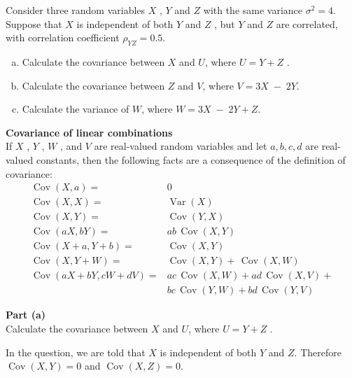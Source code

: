 \documentclass[a4paper,12pt]{article}
\begin{document}
\large \noindent Consider three random variables $X$ , $Y$ and $Z$ with the same variance $\sigma^2 = 4$. Suppose
that $X$ is independent of both $Y$ and $Z$ , but $Y$ and $Z$ are correlated, with correlation
coefficient $\rho_{YZ} = 0.5$.
\begin{enumerate}[(a)]
    \item Calculate the covariance between $X$ and $U$, where $U = Y+Z$ . 
    \item  Calculate the covariance between $Z$ and $V$, where $V = 3 X \;-\; 2 Y $. 
    \item  Calculate the variance of $W$, where $W = 3 X \;-\; 2 Y + Z .$
\end{enumerate}


\begin{framed}
\noindent \textbf{Covariance of linear combinations}\\
If 
$ {\displaystyle X} $
, 
$ {\displaystyle Y} $
, 
$ {\displaystyle W} $
, and 
${\displaystyle V}$
 are real-valued random variables and let 
${\displaystyle a,b,c,d}$ are real-valued constants, then the following facts are a consequence of the definition of covariance: 
\[
{\displaystyle {\begin{aligned}\operatorname {Cov} (X,a) =&0\\\operatorname {Cov} (X,X)=&\operatorname {Var} (X)\\\operatorname {Cov} (X,Y)=&\operatorname {Cov} (Y,X)\\\operatorname {Cov} (aX,bY)=&ab\,\operatorname {Cov} (X,Y)\\\operatorname {Cov} (X+a,Y+b)=&\operatorname {Cov} (X,Y)\\
\operatorname {Cov} (X,Y+W)=&\operatorname {Cov} (X,Y) + \,\operatorname {Cov} (X,W) \\
\operatorname {Cov} (aX+bY,cW+dV)=&ac\,\operatorname {Cov} (X,W)+ad\,\operatorname {Cov} (X,V) + \\& bc\,\operatorname {Cov} (Y,W)+bd\,\operatorname {Cov} (Y,V)\end{aligned}}} 
\]
\end{framed}
\newpage
\begin{framed}
\noindent \textbf{Part (a)} \\
\large
Calculate the covariance between $X$ and $U$, where $U = Y+Z$ . 
\end{framed}

\noindent In the question, we are told that $X$ is independent of both $Y$ and $Z$. Therefore $\operatorname{Cov}(X,Y) = 0$ and $\operatorname{Cov}(X,Z) = 0$. 
\end{document}
